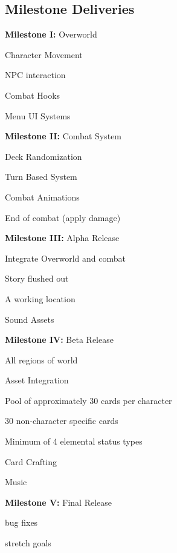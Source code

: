 \documentclass[12pt,titlepage]{article}
\newcommand{\cmark}{\ding{51}}%
\newcommand{\done}{\rlap{$\square$}{\raisebox{2pt}{\large\hspace{1pt}\cmark}}%
\hspace{-2.5pt}}
\begin{document}
\subsection{Milestone Deliveries}
\begin{todolist}
\item[\done] \textbf{Milestone I:} Overworld
    \begin{todolist}
    \item[\done] Character Movement
    \item[\done] NPC interaction
    \item[\done] Combat Hooks
    \item[\done] Menu UI Systems
    \end{todolist}

\item[\done] \textbf{Milestone II:} Combat System
    \begin{todolist}
    \item[\done] Deck Randomization
    \item[\done] Turn Based System
    \item[\done] Combat Animations
    \item[\done] End of combat (apply damage)
    \end{todolist}

\item[\done] \textbf{Milestone III:} Alpha Release
    \begin{todolist}
    \item[\done] Integrate Overworld and combat
    \item[\done] Story flushed out
    \item[\done] A working location
    \item[\done] Sound Assets
    \end{todolist}

\item \textbf{Milestone IV:} Beta Release
    \begin{todolist}
    \item All regions of world
    \item Asset Integration
    \item Pool of approximately 30 cards per character
    \item 30 non-character specific cards
    \item Minimum of 4 elemental status types
    \item Card Crafting
    \item Music
    \end{todolist}

\item \textbf{Milestone V:} Final Release
    \begin{todolist}
    \item bug fixes
    \item stretch goals
    \end{todolist}
\end{todolist}
\end{document}
